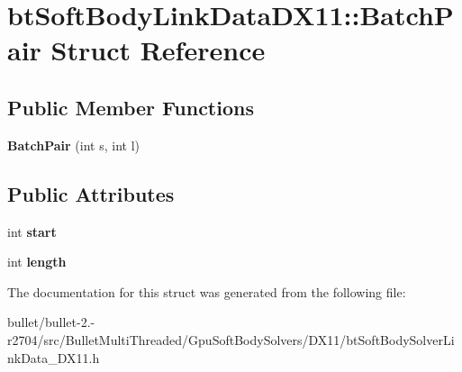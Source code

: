 \hypertarget{structbt_soft_body_link_data_d_x11_1_1_batch_pair}{\section{bt\+Soft\+Body\+Link\+Data\+D\+X11\+:\+:Batch\+Pair Struct Reference}
\label{structbt_soft_body_link_data_d_x11_1_1_batch_pair}
}
\subsection*{Public Member Functions}
\begin{DoxyCompactItemize}
\item 
\hypertarget{structbt_soft_body_link_data_d_x11_1_1_batch_pair_a06180794dcbcbec256416031d7fb94d9}{{\bfseries Batch\+Pair} (int s, int l)}\label{structbt_soft_body_link_data_d_x11_1_1_batch_pair_a06180794dcbcbec256416031d7fb94d9}

\end{DoxyCompactItemize}
\subsection*{Public Attributes}
\begin{DoxyCompactItemize}
\item 
\hypertarget{structbt_soft_body_link_data_d_x11_1_1_batch_pair_ab41ae958bbf7b403e5e6ee348c0c8daa}{int {\bfseries start}}\label{structbt_soft_body_link_data_d_x11_1_1_batch_pair_ab41ae958bbf7b403e5e6ee348c0c8daa}

\item 
\hypertarget{structbt_soft_body_link_data_d_x11_1_1_batch_pair_a33b232eba70f26c9eab3056dd0b0a296}{int {\bfseries length}}\label{structbt_soft_body_link_data_d_x11_1_1_batch_pair_a33b232eba70f26c9eab3056dd0b0a296}

\end{DoxyCompactItemize}


The documentation for this struct was generated from the following file\+:\begin{DoxyCompactItemize}
\item 
bullet/bullet-\/2.-\/r2704/src/\+Bullet\+Multi\+Threaded/\+Gpu\+Soft\+Body\+Solvers/\+D\+X11/bt\+Soft\+Body\+Solver\+Link\+Data\+\_\+\+D\+X11.\+h\end{DoxyCompactItemize}
